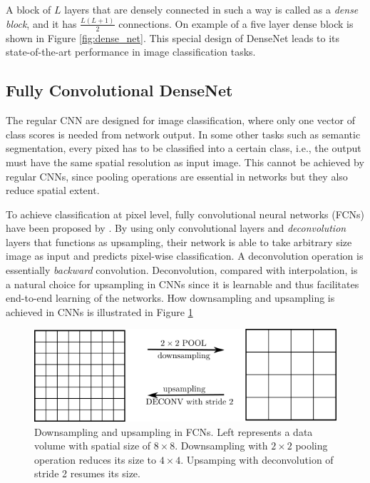 A block of $L$ layers that are densely connected in such a way is called as a \textit{dense block}, and it has $\frac{L(L+1)}{2}$ connections. On example of a five layer dense block is shown in Figure \ref{fig:dense_net}. This special design of DenseNet leads to its state-of-the-art performance in image classification tasks.

\subsection{Fully Convolutional DenseNet} \label{sec:fc_dense_net}

The regular CNN are designed for image classification, where only one vector of class scores is needed from network output. In some other tasks such as semantic segmentation, every pixed has to be classified into a certain class, i.e., the output must have the same spatial resolution as input image. This cannot be achieved by regular CNNs, since pooling operations are essential in networks but they also reduce spatial extent.

To achieve classification at pixel level, fully convolutional neural networks (FCNs) have been proposed by \citet{jegou2017one}. By using only convolutional layers and \textit{deconvolution} layers that functions as upsampling, their network is able to take arbitrary size image as input and predicts pixel-wise classification. A deconvolution operation is essentially \textit{backward} convolution. Deconvolution, compared with interpolation, is a natural choice for upsampling in CNNs since it is learnable and thus facilitates end-to-end learning of the networks. How downsampling and upsampling is achieved in CNNs is illustrated in Figure \ref{fig:sampling}

\begin{figure}[ht]
  \centering
    \includegraphics[width=.75\textwidth]{figures/sampling.png}
    \caption[Downsampling and upsampling in FCNs.]{Downsampling and upsampling in FCNs. Left represents a data volume with spatial size of $8\times8$. Downsampling with $2\times2$ pooling operation reduces its size to $4\times4$. Upsamping with deconvolution of stride 2 resumes its size.}
    \label{fig:sampling}
\end{figure}

